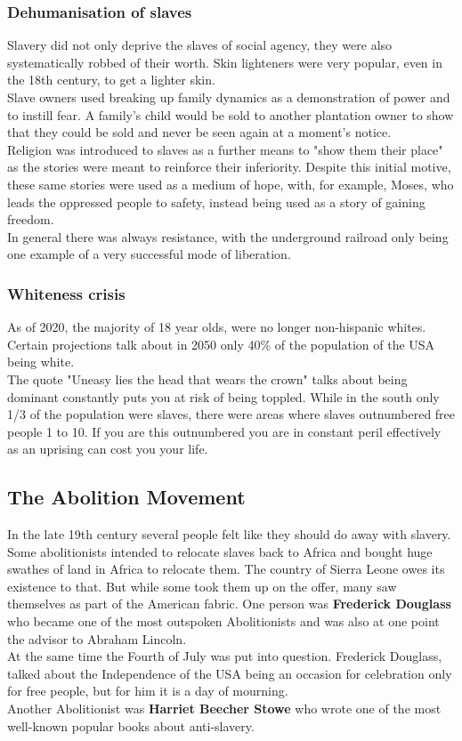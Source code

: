 \documentclass{article}
\begin{document}
	\subsubsection{Dehumanisation of slaves}
	Slavery did not only deprive the slaves of social agency, they were also systematically robbed of their worth. Skin lighteners were very popular, even in the 18th century, to get a lighter skin. \\
	Slave owners used breaking up family dynamics as a demonstration of power and to instill fear. A family's child would be sold to another plantation owner to show that they could be sold and never be seen again at a moment's notice. \\
	Religion was introduced to slaves as a further means to "show them their place" as the stories were meant to reinforce their inferiority. Despite this initial motive, these same stories were used as a medium of hope, with, for example, Moses, who leads the oppressed people to safety, instead being used as a story of gaining freedom. \\
	In general there was always resistance, with the underground railroad only being one example of a very successful mode of liberation. \\
	\subsubsection{Whiteness crisis}
	As of 2020, the majority of 18 year olds, were no longer non-hispanic whites. \\
	Certain projections talk about in 2050 only 40\% of the population of the USA being white. \\
	The quote "Uneasy lies the head that wears the crown" talks about being dominant constantly puts you at risk of being toppled. While in the south only 1/3 of the population were slaves, there were areas where slaves outnumbered free people 1 to 10. If you are this outnumbered you are in constant peril effectively as an uprising can cost you your life. \\
	\subsection{The Abolition Movement}
	In the late 19th century several people felt like they should do away with slavery. Some abolitionists intended to relocate slaves back to Africa and bought huge swathes of land in Africa to relocate them. The country of Sierra Leone owes its existence to that. But while some took them up on the offer, many saw themselves as part of the American fabric. One person was \textbf{Frederick Douglass} who became one of the most outspoken Abolitionists and was also at one point the advisor to Abraham Lincoln. \\
	At the same time the Fourth of July was put into question. Frederick Douglass, talked about the Independence of the USA being an occasion for celebration only for free people, but for him it is a day of mourning. \\
	Another Abolitionist was \textbf{Harriet Beecher Stowe} who wrote one of the most well-known popular books about anti-slavery. \\
\end{document}
